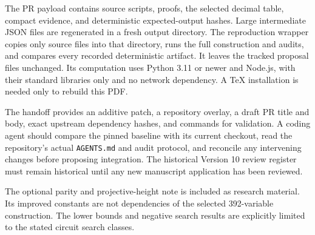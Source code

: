 \documentclass[11pt]{article}
\begin{document}
The PR payload contains source scripts, proofs, the selected decimal
table, compact evidence, and deterministic expected-output hashes. Large
intermediate JSON files are regenerated in a fresh output directory.
The reproduction wrapper copies only source files into that directory,
runs the full construction and audits, and compares every recorded
deterministic artifact. It leaves the tracked proposal files unchanged.
Its computation uses Python 3.11 or newer and Node.js, with their standard
libraries only and no network dependency. A TeX installation is needed
only to rebuild this PDF.

The handoff provides an additive patch, a repository overlay, a draft
PR title and body, exact upstream dependency hashes, and commands for
validation. A coding agent should compare the pinned baseline with its
current checkout, read the repository's actual \texttt{AGENTS.md} and
audit protocol, and reconcile any intervening changes before proposing
integration. The historical Version 10 review register must remain
historical until any new manuscript application has been reviewed.

The optional parity and projective-height note is included as research
material. Its improved constants are not dependencies of the selected
392-variable construction. The lower bounds and negative search results
are explicitly limited to the stated circuit search classes.
\end{document}
